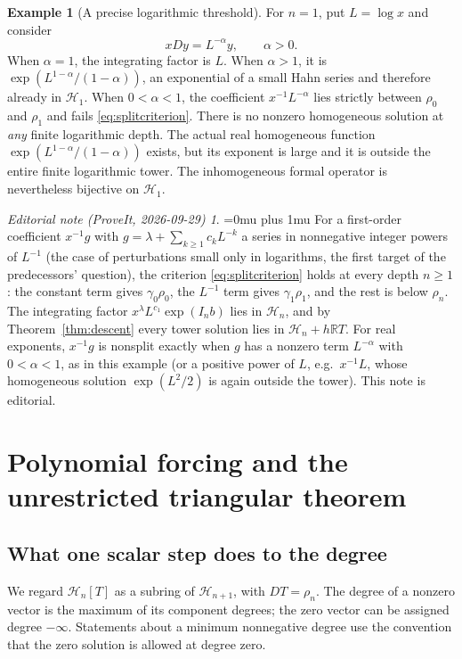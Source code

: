 \documentclass[11pt,a4paper]{article}
\numberwithin{equation}{section}
\theoremstyle{definition}
\newtheorem{example}[theorem]{Example}
\theoremstyle{remark}\newtheorem{remark}[theorem]{Remark}
\newtheorem*{ednoteinner}{Editorial note (ProveIt, 2026-09-29)}
\newenvironment{ednote}{\begin{ednoteinner}\sloppy\Urlmuskip=0mu plus 1mu\relax}{\end{ednoteinner}}
\newcommand{\R}{\mathbb R}\newcommand{\C}{\mathbb C}
\newcommand{\Hh}{\mathcal H}\newcommand{\Ll}{\mathcal L}
\begin{document}
\begin{example}[A precise logarithmic threshold]
\label{ex:threshold}
For $n=1$, put $L=\log x$ and consider
\[
 xDy=L^{-\alpha}y,\qquad \alpha>0.
\]
When $\alpha=1$, the integrating factor is $L$. When $\alpha>1$, it is
$\exp(L^{1-\alpha}/(1-\alpha))$, an exponential of a small Hahn series and therefore already in $\Hh_1$. When $0<\alpha<1$, the coefficient $x^{-1}L^{-\alpha}$ lies strictly between $\rho_0$ and $\rho_1$ and fails \eqref{eq:splitcriterion}. There is no nonzero homogeneous solution at \emph{any} finite logarithmic depth. The actual real homogeneous function
$\exp(L^{1-\alpha}/(1-\alpha))$ exists, but its exponent is large and it is outside the entire finite logarithmic tower. The inhomogeneous formal operator is nevertheless bijective on $\Hh_1$.
\end{example}

\begin{ednote}
For a first-order coefficient \(x^{-1}g\) with \(g=\lambda+\sum_{k\ge1}c_kL^{-k}\) a series in nonnegative integer powers of \(L^{-1}\) (the case of perturbations small only in logarithms, the first target of the predecessors' question), the criterion \eqref{eq:splitcriterion} holds at every depth \(n\ge1\): the constant term gives \(\gamma_0\rho_0\), the \(L^{-1}\) term gives \(\gamma_1\rho_1\), and the rest is below \(\rho_n\). The integrating factor \(x^{\lambda}L^{c_1}\exp(I_nb)\) lies in \(\Hh_n\), and by Theorem~\ref{thm:descent} every tower solution lies in \(\Hh_n+h\R T\). For real exponents, \(x^{-1}g\) is nonsplit exactly when \(g\) has a nonzero term \(L^{-\alpha}\) with \(0<\alpha<1\), as in this example (or a positive power of \(L\), e.g.\ \(x^{-1}L\), whose homogeneous solution \(\exp(L^2/2)\) is again outside the tower). This note is editorial.
\end{ednote}

\section{Polynomial forcing and the unrestricted triangular theorem}
\label{sec:triangular}
\subsection{What one scalar step does to the degree}
We regard $\Hh_n[T]$ as a subring of $\Hh_{n+1}$, with $DT=\rho_n$. The degree of a nonzero vector is the maximum of its component degrees; the zero vector can be assigned degree $-\infty$. Statements about a minimum nonnegative degree use the convention that the zero solution is allowed at degree zero.
\end{document}
